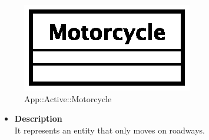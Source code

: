\begin{figure}[h]
\centering
\includegraphics[scale=0.6,keepaspectratio]{images/solution/motorcycle.eps}
\caption{App::Active::Motorcycle}
\label{fig:sd-app-motorcycle}
\end{figure}
\begin{itemize}
  \item \textbf{Description} \\
It represents an entity that only moves on roadways.
\end{itemize} 
